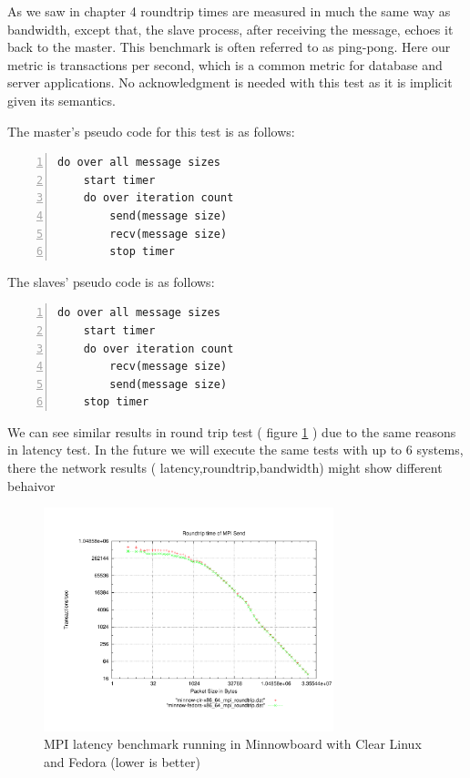 As we saw in chapter 4 roundtrip times are measured in much the same way as
bandwidth, except that, the slave process, after receiving the message, echoes
it back to the master.  This benchmark is often referred to as ping-pong. Here
our metric is transactions per second, which is a common metric for database
and server applications. No acknowledgment is needed with this test as it is
implicit given its semantics.

The master's pseudo code for this test is as follows:

\begin{lstlisting}[frame=single,numbers=left]
  do over all message sizes 
    start timer
    do over iteration count
        send(message size)
        recv(message size) 
        stop timer
\end{lstlisting}

The slaves' pseudo code is as follows:

\begin{lstlisting}[frame=single,numbers=left]
do over all message sizes 
    start timer
    do over iteration count
        recv(message size)
        send(message size)
    stop timer
\end{lstlisting}

We can see similar results in round trip test ( figure
\ref{mpi_roundtrip_clr_fedora} ) due to the same reasons in latency test. In
the future we will execute the same tests with up to 6 systems, there the
network results ( latency,roundtrip,bandwidth) might show different behaivor

\begin{figure}[H]
\centering
\includegraphics[width=0.75\textwidth]{images/mpbench_clr_experiments/mpi_roundtrip.pdf}
\caption{MPI latency benchmark running in Minnowboard with Clear Linux and
Fedora (lower is better)}
\label{mpi_roundtrip_clr_fedora}
\end{figure}

